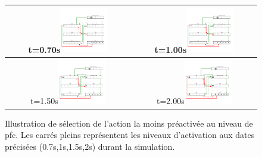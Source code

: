 \begin{figure}

\begin{tabular}{|c|c|}
\hline
t=0.70s\includegraphics[width=0.4\textwidth]{figures/ch4_11_TBG07}&
t=1.00s\includegraphics[width=0.4\textwidth]{figures/ch4_11_TBG_1}\\
\hline
t=1.50s\includegraphics[width=0.4\textwidth]{figures/ch4_11_TBG_15} &
t=2.00s\includegraphics[width=0.4\textwidth]{figures/ch4_11_TBG_2}\\
\hline
\end {tabular}
\caption{ Illustration de sélection de l'action la moins préactivée au niveau de \protect\gls{pfc}. Les carrés pleins représentent les niveaux d'activation aux dates précisées (0.7s,1s,1.5s,2s) durant la simulation. }
\label{Select}

\end{figure}

